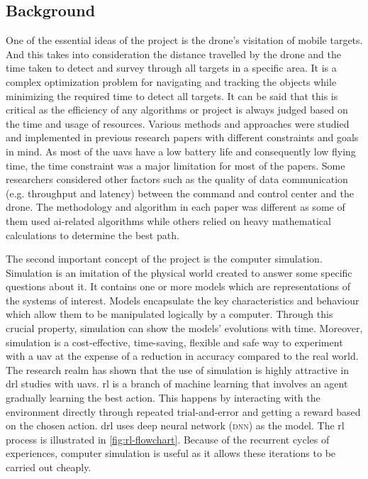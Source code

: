 \documentclass[../main.tex]{subfiles}
\begin{document}
\subsection{Background}

One of the essential ideas of the project 
is the drone's visitation of mobile 
targets. And this takes into consideration 
the distance travelled by the drone and 
the time taken to detect and survey 
through all targets in a specific area.
It is a complex optimization problem 
for navigating and tracking the objects 
while minimizing the required time to detect all targets.
It can be said that this is critical as the efficiency of any algorithms 
or project is always judged based on the time 
and usage of resources.
Various methods and approaches were studied 
and implemented 
in previous research papers with different 
constraints and 
goals in mind.
As most of the \glspl{uav} have a low battery life 
and consequently low flying time, the time 
constraint was a major limitation 
for most of the papers. 
Some researchers considered other factors such 
as the quality 
of data communication (e.g. throughput and latency) 
between the command and control 
center and the drone.
The methodology and algorithm in each paper was 
different 
as some of them used \gls{ai}-related algorithms while 
others relied 
on heavy mathematical calculations to determine 
the best path.

The second important concept of the project is the computer simulation.
Simulation is an imitation of the physical world
created to answer some specific questions about it.
It contains one or more models 
which are representations of the systems of interest.
Models encapsulate the key characteristics and behaviour 
which allow them to be manipulated logically by a computer.
Through this crucial property, simulation can show 
the models' evolutions with time.
Moreover, simulation is a cost-effective, time-saving, flexible 
and safe way to experiment with a \gls{uav}
at the expense of a reduction in accuracy compared to the real world.
The research realm has shown that the use of simulation 
is highly attractive in \gls{drl} studies with \glspl{uav}.
\gls{rl} is a branch of machine learning that involves
an agent gradually learning the best action. This happens by 
interacting with 
the environment directly through repeated trial-and-error
and getting a reward based on the chosen action.
\gls{drl} uses deep neural network (\textsc{dnn}) as the
model.
The \gls{rl} process is illustrated in 
\cref{fig:rl-flowchart}.
Because of the recurrent cycles of experiences, 
computer simulation is useful as it
allows these iterations to be carried out cheaply.
\end{document}
